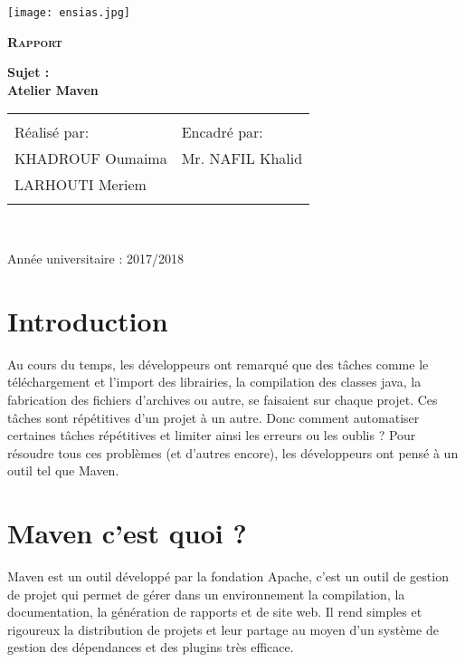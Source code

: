\documentclass{report}
\begin{document}
\thispagestyle{empty} 
\texttt{[image: ensias.jpg]}\\\vfill 
\begin{center}
\Huge \textsc\textbf{Rapport}\\\vfill

\textbf{Sujet :\\ Atelier Maven}\normalsize \\\vfill
                                                                  
\begin{tabular}{ll}
\hline\hline\\
Réalisé par: & Encadré par:\\
KHADROUF Oumaima & Mr. NAFIL Khalid\\ 
LARHOUTI Meriem\\
\hline\hline\\                                     
\end{tabular}\\\vfill
\end{center}      


Année universitaire : 2017/2018

\newpage
\tableofcontents
\newpage
\section{Introduction}
Au cours du temps, les développeurs ont remarqué que des tâches comme le téléchargement et l'import des librairies, la compilation des classes java, la fabrication des fichiers d'archives ou autre, se faisaient sur chaque projet. Ces tâches sont répétitives d'un projet à un autre. 
Donc comment automatiser certaines tâches répétitives et limiter ainsi les erreurs ou les oublis ?
Pour résoudre tous ces problèmes (et d'autres encore), les développeurs ont pensé à un outil tel que Maven.
 
\section{Maven c'est quoi ?}
Maven est un outil développé par la fondation Apache, c'est un outil de gestion de projet qui permet de gérer dans un environnement la compilation, la documentation, la génération de rapports et de site web. Il rend simples et rigoureux la distribution de projets et leur partage au moyen d'un système de gestion des dépendances et des plugins très efficace.
\end{document}
